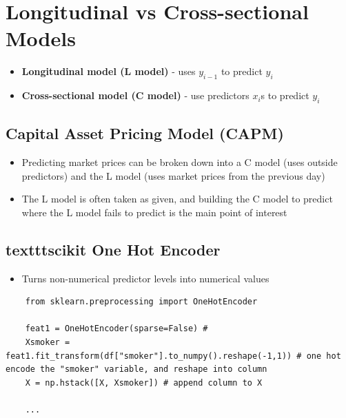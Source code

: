 \documentclass{article}
\begin{document}
\section{Longitudinal vs Cross-sectional Models}
\begin{itemize}
    \item \textbf{Longitudinal model (L model)} - uses $y_{i-1}$ to predict $y_i$
    \item \textbf{Cross-sectional model (C model)} - use predictors $x_{i}$s to predict $y_i$
\end{itemize}

\subsection{Capital Asset Pricing Model (CAPM)}
\begin{itemize}
    \item Predicting market prices can be broken down into a C model (uses outside predictors) and the L model (uses market prices from the previous day)
    \item The L model is often taken as given, and building the C model to predict where the L model fails to predict is the main point of interest
\end{itemize}

\subsection{texttt{scikit} One Hot Encoder}
\begin{itemize}
    \item Turns non-numerical predictor levels into numerical values
\end{itemize}
\begin{verbatim}
    from sklearn.preprocessing import OneHotEncoder

    feat1 = OneHotEncoder(sparse=False) #
    Xsmoker = feat1.fit_transform(df["smoker"].to_numpy().reshape(-1,1)) # one hot encode the "smoker" variable, and reshape into column
    X = np.hstack([X, Xsmoker]) # append column to X

    ...
\end{verbatim}
\end{document}

